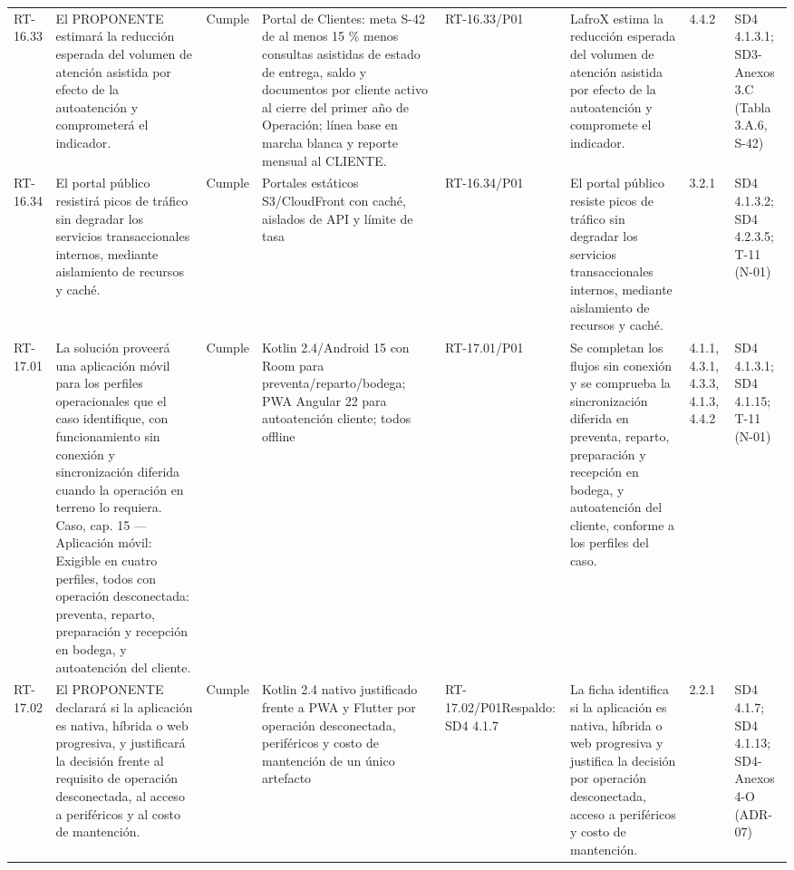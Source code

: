\documentclass[oficio,firma,final]{lafrox}
\begin{document}
\begin{landscape}
{\begin{longtable}{@{}F{0.054} F{0.173} F{0.061} F{0.191} F{0.106} F{0.180} F{0.067} F{0.168}@{}}
  RT-16.33 & El PROPONENTE estimará la reducción esperada del volumen de atención asistida por efecto de la autoatención y comprometerá el indicador. & Cumple & Portal de Clientes: meta S-42 de al menos 15 \% menos consultas asistidas de estado de entrega, saldo y documentos por cliente activo al cierre del primer año de Operación; línea base en marcha blanca y reporte mensual al CLIENTE. & RT-16.33/\allowbreak{}P01 & LafroX estima la reducción esperada del volumen de atención asistida por efecto de la autoatención y compromete el indicador. & 4.4.2 & SD4 4.1.3.1; SD3-Anexos 3.C (Tabla 3.A.6, S-42)  \\
  RT-16.34 & El portal público resistirá picos de tráfico sin degradar los servicios transaccionales internos, mediante aislamiento de recursos y caché. & Cumple & Portales estáticos S3/CloudFront con caché, aislados de API y límite de tasa & RT-16.34/\allowbreak{}P01 & El portal público resiste picos de tráfico sin degradar los servicios transaccionales internos, mediante aislamiento de recursos y caché. & 3.2.1 & SD4 4.1.3.2; SD4 4.2.3.5; T-11 (N-01)  \\
  RT-17.01 & La solución proveerá una aplicación móvil para los perfiles operacionales que el caso identifique, con funcionamiento sin conexión y sincronización diferida cuando la operación en terreno lo requiera. Caso, cap. 15 — Aplicación móvil: Exigible en cuatro perfiles, todos con operación desconectada: preventa, reparto, preparación y recepción en bodega, y autoatención del cliente. & Cumple & Kotlin 2.4/Android 15 con Room para preventa/reparto/bodega; PWA Angular 22 para autoatención cliente; todos offline & RT-17.01/\allowbreak{}P01 & Se completan los flujos sin conexión y se comprueba la sincronización diferida en preventa, reparto, preparación y recepción en bodega, y autoatención del cliente, conforme a los perfiles del caso. & 4.1.1, 4.3.1, 4.3.3, 4.1.3, 4.4.2 & SD4 4.1.3.1; SD4 4.1.15; T-11 (N-01)  \\
  RT-17.02 & El PROPONENTE declarará si la aplicación es nativa, híbrida o web progresiva, y justificará la decisión frente al requisito de operación desconectada, al acceso a periféricos y al costo de mantención. & Cumple & Kotlin 2.4 nativo justificado frente a PWA y Flutter por operación desconectada, periféricos y costo de mantención de un único artefacto & RT-17.02/\allowbreak{}P01\newline Respaldo: SD4 4.1.7 & La ficha identifica si la aplicación es nativa, híbrida o web progresiva y justifica la decisión por operación desconectada, acceso a periféricos y costo de mantención. & 2.2.1 & SD4 4.1.7; SD4 4.1.13; SD4-Anexos 4-O (ADR-07)  \\

\end{longtable}}
\end{landscape}
\end{document}
